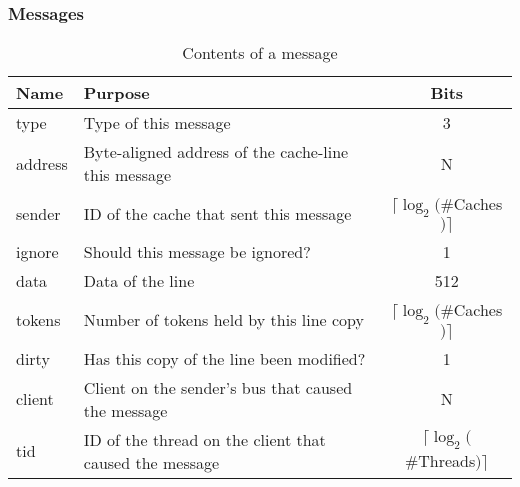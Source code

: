 \subsubsection{Messages}
\begin{table}
\begin{center}
\begin{tabularx}{\textwidth}{|l|X|c|}
\hline
Name & Purpose & Bits\\
\hline
\hline
type & Type of this message & 3 \\
address & Byte-aligned address of the cache-line this message & N \\
sender & ID of the cache that sent this message & $\lceil \log_2($\#Caches$)\rceil$ \\
ignore & Should this message be ignored? & 1 \\
data & Data of the line & 512 \\
tokens & Number of tokens held by this line copy & $\lceil \log_2($\#Caches$)\rceil$ \\
dirty & Has this copy of the line been modified? & 1 \\
client & Client on the sender's bus that caused the message & N \\
tid & ID of the thread on the client that caused the message & $\lceil \log_2($\#Threads$)\rceil$ \\
\hline
\end{tabularx}
\caption{Contents of a message}
\label{table:message_contents}
\end{center}
\end{table}


